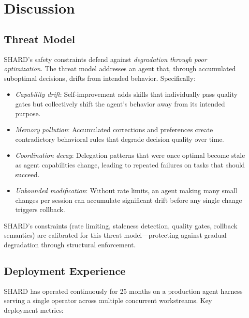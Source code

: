 \documentclass[11pt]{article}
\begin{document}
\section{Discussion}

\subsection{Threat Model}

SHARD's safety constraints defend against \emph{degradation through poor optimization}. The threat model addresses an agent that, through accumulated suboptimal decisions, drifts from intended behavior. Specifically:

\begin{itemize}[nosep]
\item \emph{Capability drift}: Self-improvement adds skills that individually pass quality gates but collectively shift the agent's behavior away from its intended purpose.
\item \emph{Memory pollution}: Accumulated corrections and preferences create contradictory behavioral rules that degrade decision quality over time.
\item \emph{Coordination decay}: Delegation patterns that were once optimal become stale as agent capabilities change, leading to repeated failures on tasks that should succeed.
\item \emph{Unbounded modification}: Without rate limits, an agent making many small changes per session can accumulate significant drift before any single change triggers rollback.
\end{itemize}

SHARD's constraints (rate limiting, staleness detection, quality gates, rollback semantics) are calibrated for this threat model---protecting against gradual degradation through structural enforcement.

\subsection{Deployment Experience}

SHARD has operated continuously for 25 months on a production agent harness serving a single operator across multiple concurrent workstreams. Key deployment metrics:
\end{document}
